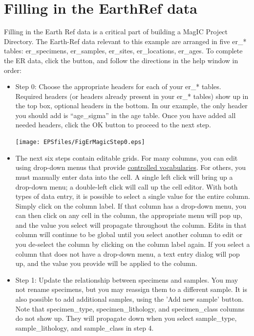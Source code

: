 \documentclass[11pt]{book}
\begin{document}
{\section{Filling in the EarthRef data}

Filling in the Earth Ref data is a critical part of building a MagIC Project Directory. The Earth-Ref data relevant to this example are arranged in five er\_* tables: er\_specimens, er\_samples, er\_sites, er\_locations, er\_ages. To complete the  ER data, click the button, and follow the directions in the help window in order:

\begin{itemize}
\item Step 0: Choose the appropriate headers for each of your er\_* tables.  Required headers (or headers already present in your er\_* tables) show up in the top box, optional headers in the bottom.  In our example, the only header you should add is ``age_sigma'' in the age table.  Once you have added all needed headers, click the OK button to proceed to the next step.

 \texttt{[image: EPSfiles/FigErMagicStep0.eps]}

 \item The next six steps contain editable grids.  For many columns, you can edit using drop-down menus that provide \href{http://earthref.org/MAGIC/shortlists.htm}{controlled vocabularies}.  For others, you must manually enter data into the cell.  A single left click will bring up a drop-down menu; a double-left click will call up the cell editor.  With both types of data entry, it is possible to select a single value for the entire column. Simply click on the column label.  If that column has a drop-down menu, you can then click on any cell in the column, the appropriate menu will pop up, and the value you select will propagate throughout the column.  Edits in that column will continue to be global until you select another column to edit or you de-select the column by clicking on the column label again.  If you select a column that does not have a drop-down menu, a text entry dialog will pop up, and the value you provide will be applied to the column.

 \item Step 1: Update the relationship between specimens and samples.  You may not rename specimens, but you may reassign them to a different sample.  It is also possible to add additional samples, using the 'Add new sample' button.  Note that specimen\_type, specimen\_lithology, and specimen\_class columns do not show up.  They will propagate down when you select sample\_type, sample\_lithology, and sample\_class in step 4.


\end{itemize}}
\end{document}
